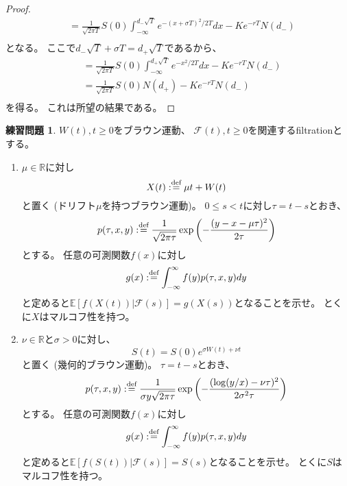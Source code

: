 \documentclass[uplatex]{jsarticle}
\theoremstyle{definition}
\newtheorem{prob}[prob]{練習問題}
\def\R{\mathbb{R}}
\def\E{\mathbb{E}}
\def\mcF{\mathcal{F}}
\def\dfn{:\overset{\mbox{{\scriptsize def}}}{=}}
\begin{document}
\begin{proof}
\begin{align*}
    &= \frac{1}{\sqrt{2\pi T}}S(0)
    \int_{-\infty}^{d_-\sqrt{T}}e^{-(x + \sigma T)^2/2T}dx
    - Ke^{-rT}N(d_-) \\
  \end{align*}
  となる。
  ここで\(d_-\sqrt{T} + \sigma T = d_+\sqrt{T}\)であるから、
  \begin{align*}
    &= \frac{1}{\sqrt{2\pi T}}S(0)
    \int_{-\infty}^{d_+\sqrt{T}}e^{-x^2/2T}dx
    - Ke^{-rT}N(d_-) \\
    &= \frac{1}{\sqrt{2\pi T}}S(0) N(d_+) - Ke^{-rT}N(d_-) \\
  \end{align*}
  を得る。
  これは所望の結果である。
\end{proof}


\begin{prob}\label{prob: 3.6}
  \(W(t) , t\geq 0\)をブラウン運動、
  \(\mcF(t) , t\geq 0\)を関連するfiltrationとする。
  \begin{enumerate}
    \item \label{enumi: 3.6-1}
    \(\mu \in \R\)に対し
    \[
    X(t) \dfn \mu t + W(t)
    \]
    と置く (ドリフト\(\mu\)を持つブラウン運動)。
    \(0\leq s < t\)に対し\(\tau = t-s\)とおき、
    \[
    p(\tau,x,y) \dfn \frac{1}{\sqrt{2\pi\tau}}
    \exp\left( -\frac{(y-x-\mu\tau)^2}{2\tau}\right)
    \]
    とする。
    任意の可測関数\(f(x)\)に対し
    \[g(x) \dfn \int_{-\infty}^\infty f(y)p(\tau,x,y)dy\]
    と定めると\(\E[f(X(t))|\mcF(s)] = g(X(s))\)となることを示せ。
    とくに\(X\)はマルコフ性を持つ。
    \item \label{enumi: 3.6-2}
    \(\nu\in \R\)と\(\sigma > 0\)に対し、
    \[
    S(t) = S(0)e^{\sigma W(t) + \nu t}
    \]
    と置く (幾何的ブラウン運動)。
    \(\tau = t-s\)とおき、
    \[
    p(\tau,x,y) \dfn \frac{1}{\sigma y \sqrt{2\pi \tau}}
    \exp\left( -\frac{(\log(y/x) - \nu\tau)^2}{2\sigma^2\tau}\right)
    \]
    とする。
    任意の可測関数\(f(x)\)に対し
    \[g(x) \dfn \int_{-\infty}^\infty f(y)p(\tau,x,y)dy\]
    と定めると\(\E[f(S(t))|\mcF(s)] = S(s)\)となることを示せ。
    とくに\(S\)はマルコフ性を持つ。
  \end{enumerate}
\end{prob}
\end{document}
